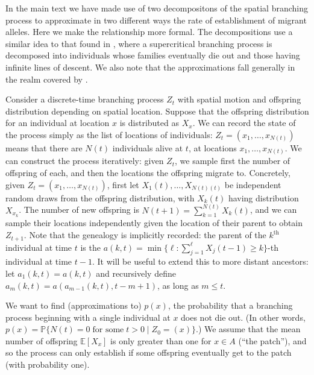 \documentclass{article}
\renewcommand{\P}{\mathbb{P}}
\newcommand{\E}{\mathbb{E}}
\begin{document}
In the main text we have made use of two decompositons of the spatial branching process
to approximate in two different ways the rate of establishment of migrant alleles.
Here we make the relationship more formal.
The decompositions use a similar idea to that found in \citep[section D.12]{athreyaney},
where a supercritical branching process is decomposed into individuals whose families eventually die out
and those having infinite lines of descent.
We also note that the approximations fall generally in the realm covered by \citet{aldouspoissonclumping}.

Consider a discrete-time branching process $Z_t$ with spatial motion and offspring distribution depending on spatial location.
Suppose that the offspring distribution for an individual at location $x$ is distributed as $X_x$.
We can record the state of the process simply as the list of locations of individuals:
$Z_t = (x_1, \ldots, x_{N(t)})$ means that there are $N(t)$ individuals alive at $t$, at locations $x_1, \ldots, x_{N(t)}$.
We can construct the process iteratively: given $Z_t$,
we sample first the number of offspring of each, and then the locations the offspring migrate to.
Concretely, given $Z_{t} = (x_1, \ldots, x_{N(t)})$,
first let $X_1(t),\ldots,X_{N(t)(t)}$ be independent random draws from the offspring distribution,
with $X_k(t)$ having distribution $X_{x_k}$.
The number of new offspring is $N(t+1) = \sum_{k=1}^{N(t)} X_k(t)$,
and we can sample their locations independently given the location of their parent to obtain $Z_{t+1}$.
Note that the genealogy is implicitly recorded:
the parent of the $k^\mathrm{th}$ individual at time $t$ is
the $a(k,t) = \min\{ \ell : \sum_{j=1}^\ell X_j(t-1) \ge k \}$-th individual at time $t-1$.
It will be useful to extend this to more distant ancestors:
let $a_1(k,t) = a(k,t)$ and recursively define $a_m(k,t) = a(a_{m-1}(k,t),t-m+1)$, as long as $m\le t$.

We want to find (approximations to) $p(x)$, the probability that a branching process beginning with a single individual at $x$ does not die out. 
(In other words, $p(x) = \P\{ N(t) = 0 \; \mbox{for some}\; t>0 \; \vert \; Z_0 = (x) \}$.)
We assume that the mean number of offspring $\E[X_x]$ is only greater than one for $x \in A$ (``the patch''),
and so the process can only establish if some offspring eventually get to the patch (with probability one).
\end{document}
